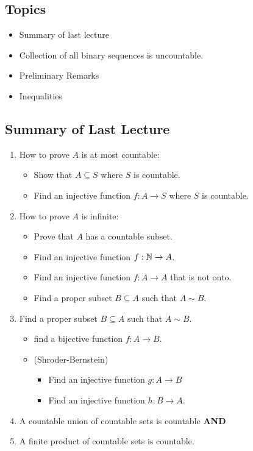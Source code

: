 \documentclass[a4paper]{report}
\begin{document}
\subsection{Topics}
\begin{itemize}
    \item Summary of last lecture
    \item Collection of all binary sequences is uncountable.
    \item Preliminary Remarks
    \item Inequalities
\end{itemize}

\subsection{Summary of Last Lecture}


\begin{enumerate}
    \item How to prove \( A  \) is at most countable:
        \begin{itemize}
            \item Show that \( A \subseteq S   \) where \( S  \) is countable.
            \item Find an injective function \( f: A \to S  \) where \( S  \) is countable.  
        \end{itemize}
    \item How to prove \( A  \) is infinite:
        \begin{itemize}
            \item Prove that \( A  \) has a countable subset.
            \item Find an injective function \( f: \mathbb{N} \to A  \).
            \item Find an injective function \( f: A \to A  \) that is not onto.
            \item Find a proper subset \( B \subseteq  A  \) such that \( A \sim B  \).
        \end{itemize}
    \item Find a proper subset \( B \subseteq  A   \) such that \( A \sim B  \).
        \begin{itemize}
            \item find a bijective function \( f: A \to B  \).
            \item (Shroder-Bernstein) 
                \begin{itemize}
                    \item Find an injective function \( g: A \to B  \)
                    \item Find an injective function \( h: B \to A  \).
                \end{itemize}
        \end{itemize}
\item A countable union of countable sets is countable \textbf{AND}
\item A finite product of countable sets is countable. 
\end{enumerate}
\end{document}
